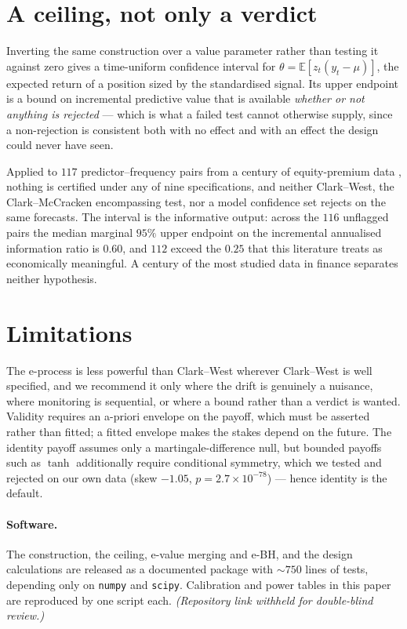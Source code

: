 \documentclass{article}
\begin{document}
\section{A ceiling, not only a verdict}

Inverting the same construction over a value parameter rather than testing it against zero
gives a time-uniform confidence interval for $\theta=\mathbb{E}[z_t(y_t-\mu)]$, the expected
return of a position sized by the standardised signal. Its upper endpoint is a bound on
incremental predictive value that is available \emph{whether or not anything is rejected} ---
which is what a failed test cannot otherwise supply, since a non-rejection is consistent both
with no effect and with an effect the design could never have seen.

Applied to $117$ predictor--frequency pairs from a century of equity-premium data
\citep{goyal2024}, nothing is certified under any of nine specifications, and neither
Clark--West, the Clark--McCracken encompassing test, nor a model confidence set \citep{hansen2011} rejects on the
same forecasts. The interval is the informative output: across the $116$ unflagged pairs the
median marginal $95\%$ upper endpoint on the incremental annualised information ratio is
$0.60$, and $112$ exceed the $0.25$ that this literature treats as economically meaningful. A
century of the most studied data in finance separates neither hypothesis.

\section{Limitations}

The e-process is less powerful than Clark--West wherever Clark--West is well specified, and we
recommend it only where the drift is genuinely a nuisance, where monitoring is sequential, or
where a bound rather than a verdict is wanted. Validity requires an a-priori envelope on the
payoff, which must be asserted rather than fitted; a fitted envelope makes the stakes depend on
the future. The identity payoff assumes only a martingale-difference null, but bounded payoffs
such as $\tanh$ additionally require conditional symmetry, which we tested and rejected on our
own data (skew $-1.05$, $p=2.7\times10^{-78}$) --- hence identity is the default.

\paragraph{Software.} The construction, the ceiling, e-value merging and e-BH, and the design
calculations are released as a documented package with $\sim\!750$ lines of tests, depending
only on \texttt{numpy} and \texttt{scipy}. Calibration and power tables in this paper are
reproduced by one script each. \emph{(Repository link withheld for double-blind review.)}



\end{document}
